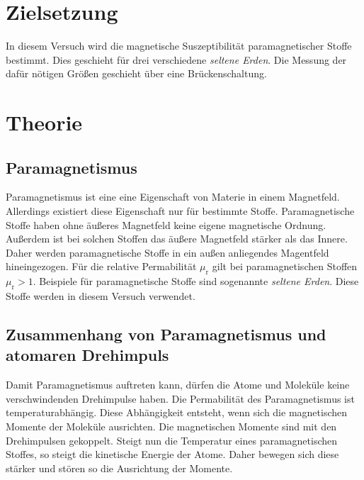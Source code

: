 \section{Zielsetzung}
\label{sec:ziel}
In diesem Versuch wird die magnetische Suszeptibilität paramagnetischer Stoffe bestimmt. Dies geschieht für drei verschiedene \textit{seltene Erden}. Die Messung der dafür nötigen
Größen geschieht über eine Brückenschaltung.

\section{Theorie}
\label{sec:Theorie}

\subsection{Paramagnetismus}
\label{subsec:paramagnetismus}
Paramagnetismus ist eine eine Eigenschaft von Materie in einem Magnetfeld. Allerdings existiert diese Eigenschaft nur für bestimmte Stoffe. Paramagnetische Stoffe haben ohne 
äußeres Magnetfeld keine eigene magnetische Ordnung. Außerdem ist bei solchen Stoffen das äußere Magnetfeld stärker als das Innere. Daher werden paramagnetische Stoffe in ein
außen anliegendes Magentfeld hineingezogen. Für die relative Permabilität $\mu_{\text{r}}$ gilt bei paramagnetischen Stoffen $ \mu_\text{r} > 1 $. Beispiele für paramagnetische 
Stoffe sind sogenannte \textit{seltene Erden}. Diese Stoffe werden in diesem Versuch verwendet. 

\subsection{Zusammenhang von Paramagnetismus und atomaren Drehimpuls}
\label{subsec:drehimpuls}
Damit Paramagnetismus auftreten kann, dürfen die Atome und Moleküle keine verschwindenden Drehimpulse haben. Die Permabilität des 
Paramagnetismus ist temperaturabhängig. Diese Abhängigkeit entsteht, wenn sich die magnetischen Momente der Moleküle ausrichten. Die magnetischen Momente sind mit den Drehimpulsen 
gekoppelt. Steigt nun die Temperatur eines paramagnetischen Stoffes, so steigt die kinetische Energie der Atome. Daher bewegen sich diese stärker und stören so die Ausrichtung
der Momente. 

